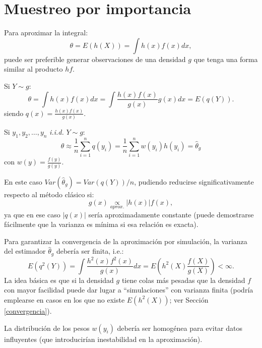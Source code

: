 \documentclass[
]{book}
\theoremstyle{break}
\theoremstyle{nonumberplain}
\begin{document}
\hypertarget{muestreo-importancia}{%
\section{Muestreo por importancia}\label{muestreo-importancia}}

Para aproximar la integral:
\[\theta = E\left( h\left( X\right) \right) = \int h\left( x\right) f(x)dx,\]
puede ser preferible generar observaciones de una densidad \(g\) que tenga una forma similar al producto \(hf\).

Si \(Y\sim g\):
\[\theta  = \int h\left( x\right) f(x)dx 
 = \int \frac{h\left( x\right) f(x)}{g(x)}g(x)dx
 = E\left( q\left( Y\right) \right).\]
siendo
\(q\left( x\right) = \frac{h\left( x\right) f(x)}{g(x)}\).

Si \(y_1,y_2,\ldots ,y_n\) \emph{i.i.d.} \(Y\sim g\):
\[\theta \approx \frac{1}{n}\sum\limits_{i=1}^nq\left( y_i\right) 
= \frac{1}{n}\sum\limits_{i=1}^nw(y_i)h\left( y_i\right)  
= \hat{\theta}_{g}\]
con \(w(y) = \frac{f(y)}{g(y)}\).

En este caso \(Var(\hat{\theta}_{g}) = Var\left( q\left( Y\right) \right) /n\), pudiendo reducirse significativamente respecto al método clásico si:
\[g(x)\underset{aprox.}{\propto } \left\vert h(x) \right\vert f(x),\]
ya que en ese caso \(\left\vert q(x) \right\vert\) sería aproximadamente constante (puede demostrarse fácilmente que la varianza es mínima si esa relación es exacta).

Para garantizar la convergencia de la aproximación por simulación, la varianza del estimador \(\hat{\theta}_{g}\) debería ser finita, i.e.:
\[E\left( q^2\left( Y\right) \right)  
= \int \frac{h^2\left( x\right)f^2(x)}{g(x)}dx 
= E\left( h^2\left( X\right) \frac{f(X)}{g(X)}\right)
< \infty.\]
La idea básica es que si la densidad \(g\) tiene colas más pesadas que la densidad \(f\) con mayor facilidad puede dar lugar a ``simulaciones'' con varianza finita (podría emplearse en casos en los que no existe \(E \left( h^2 \left( X \right) \right)\); ver Sección \ref{convergencia}).

La distribución de los pesos \(w(y_i)\) debería ser homogénea para evitar datos influyentes (que introducirían inestabilidad en la aproximación).
\end{document}
